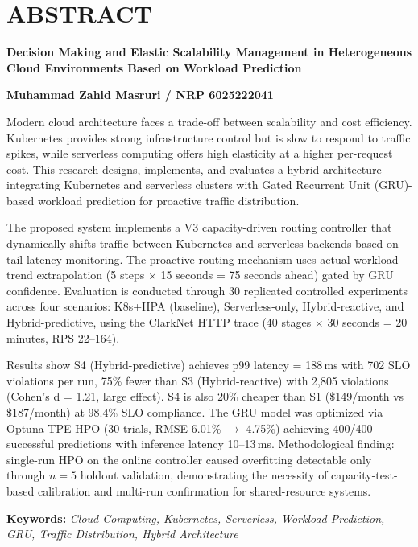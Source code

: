 
\clearpage


\section*{\large \centering \MakeUppercase 
    {Abstract}
}

\begin{center}

    \justifying \normalsize

    \textbf{Decision Making and Elastic Scalability Management in Heterogeneous Cloud Environments Based on Workload Prediction}

    \vspace{0.5cm}

    \textbf{Muhammad Zahid Masruri / NRP 6025222041}

    \vspace{0.5cm}

    Modern cloud architecture faces a trade-off between scalability and cost efficiency. Kubernetes provides strong infrastructure control but is slow to respond to traffic spikes, while serverless computing offers high elasticity at a higher per-request cost. This research designs, implements, and evaluates a hybrid architecture integrating Kubernetes and serverless clusters with Gated Recurrent Unit (GRU)-based workload prediction for proactive traffic distribution.

    The proposed system implements a V3 capacity-driven routing controller that dynamically shifts traffic between Kubernetes and serverless backends based on tail latency monitoring. The proactive routing mechanism uses actual workload trend extrapolation (5 steps $\times$ 15 seconds = 75 seconds ahead) gated by GRU confidence. Evaluation is conducted through 30 replicated controlled experiments across four scenarios: K8s+HPA (baseline), Serverless-only, Hybrid-reactive, and Hybrid-predictive, using the ClarkNet HTTP trace (40 stages $\times$ 30 seconds = 20 minutes, RPS 22--164).

    Results show S4 (Hybrid-predictive) achieves p99 latency = 188\,ms with 702 SLO violations per run, 75\% fewer than S3 (Hybrid-reactive) with 2,805 violations (Cohen's d = 1.21, large effect). S4 is also 20\% cheaper than S1 (\$149/month vs \$187/month) at 98.4\% SLO compliance. The GRU model was optimized via Optuna TPE HPO (30 trials, RMSE 6.01\% $\rightarrow$ 4.75\%) achieving 400/400 successful predictions with inference latency 10--13\,ms. Methodological finding: single-run HPO on the online controller caused overfitting detectable only through $n=5$ holdout validation, demonstrating the necessity of capacity-test-based calibration and multi-run confirmation for shared-resource systems.

    \vspace{0.5cm}

    \textbf{Keywords:} \emph{Cloud Computing, Kubernetes, Serverless, Workload Prediction, GRU, Traffic Distribution, Hybrid Architecture}

\end{center}

\clearpage

